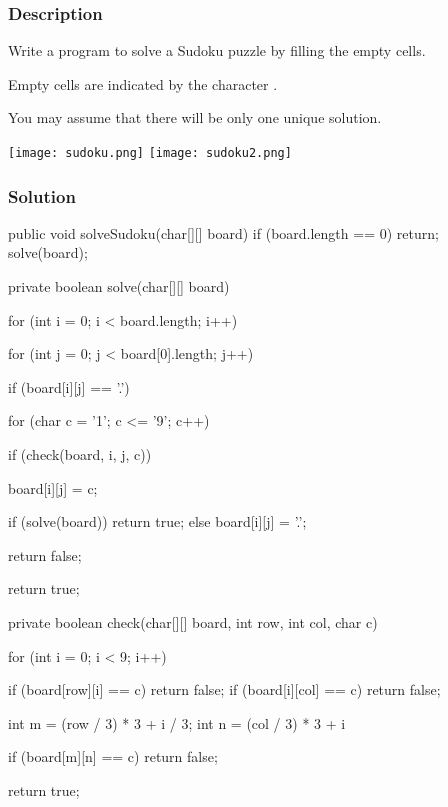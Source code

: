 \subsubsection{Description}

Write a program to solve a Sudoku puzzle by filling the empty cells.

Empty cells are indicated by the character .

You may assume that there will be only one unique solution.

\begin{center}
\texttt{[image: sudoku.png]}
\texttt{[image: sudoku2.png]}
\end{center}

\subsubsection{Solution}

\begin{Code}
public void solveSudoku(char[][] board) {
    if (board.length == 0) {
        return;
    }
    solve(board);
}

private boolean solve(char[][] board) {
    for (int i = 0; i < board.length; i++) {
        for (int j = 0; j < board[0].length; j++) {
            if (board[i][j] == '.') {
                for (char c = '1'; c <= '9'; c++) {
                    if (check(board, i, j, c)) {
                        board[i][j] = c;

                        if (solve(board)) {
                            return true;
                        } else {
                            board[i][j] = '.';
                        }
                    }
                }
                return false;
            }
        }
    }
    return true;
}
\end{Code}

\newpage

\begin{Code}
private boolean check(char[][] board, int row, int col, char c) {
    for (int i = 0; i < 9; i++) {
        if (board[row][i] == c) {
            return false;
        }
        if (board[i][col] == c) {
            return false;
        }

        int m = (row / 3) * 3 + i / 3;
        int n = (col / 3) * 3 + i %

        if (board[m][n] == c) {
            return false;
        }
    }
    return true;
}
\end{Code}

